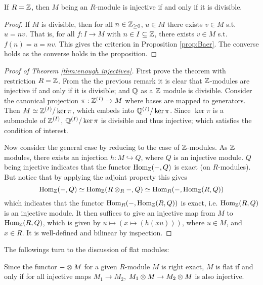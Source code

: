 \documentclass{article}
\begin{document}
\begin{corollary}
    If $R = \mathbb{Z}$, then $M$ being an $R$-module is injective if and only if it is divisible.
\end{corollary}

\begin{proof}
    If $M$ is divisible, then for all $n\in \mathbb{Z}_{\geq 0}$, $u\in M$ there exists $v \in M$ s.t. $u = nv$. That is, for all $f: I \to M$ with $n \in I \subseteq \mathbb{Z}$, there exists $v \in M$ s.t. $f(n) = u = nv$. This gives the criterion in Proposition \ref{prop:Baer}. The converse holds as the converse holds in the proposition.
\end{proof}

\begin{proof}[Proof of Theorem \ref{thm:enough injectives}]
    First prove the theorem with restriction $R = \mathbb{Z}$. From the the previous remark it is clear that $\mathbb{Z}$-modules are injective if and only if it is divisible; and $\mathbb{Q}$ as a $\mathbb{Z}$ module is divisible. Consider the canonical projection $\pi: \mathbb{Z}^{(I)} \to M$ where bases are mapped to generators. Then $M \simeq \mathbb{Z}^{(I)}/\ker \pi$, which embeds into $\mathbb{Q}^{(I)}/\ker \pi$. Since $\ker\pi$ is a submodule of $\mathbb{Z}^{(I)}$, $\mathbb{Q}^{(I)}/\ker \pi$ is divisible and thus injective; which satisfies the condition of interest.

    Now consider the general case by reducing to the case of $\mathbb{Z}$-modules. As $\mathbb{Z}$ modules, there exists an injection $h: M \hookrightarrow Q$, where $Q$ is an injective module. $Q$ being injective indicates that the functor $\mathrm{Hom}_{\mathbb{Z}}(-, Q)$ is exact (on $R$-modules). But notice that by applying the adjoint property this gives
    \[
        \mathrm{Hom}_{\mathbb{Z}}(-, Q) \simeq \mathrm{Hom}_{\mathbb{Z}}(R \otimes_R -, Q) \simeq \mathrm{Hom}_{R}(-, \mathrm{Hom}_{\mathbb{Z}}(R, Q))
    \] 
    which indicates that the functor $\mathrm{Hom}_{R}(-, \mathrm{Hom}_{\mathbb{Z}}(R, Q))$ is exact, i.e. $\mathrm{Hom}_{\mathbb{Z}}(R, Q)$ is an injective module. It then suffices to give an injective map from $M$ to $\mathrm{Hom}_{\mathbb{Z}}(R, Q)$, which is given by $u \mapsto (x \mapsto (h(xu)))$, where $u \in M$, and $x \in R$. It is well-defined and bilinear by inspection.
\end{proof}

The followings turn to the discussion of flat modules:

\begin{remark}
    Since the functor $- \otimes M$ for a given $R$-module $M$ is right exact, $M$ is flat if and only if for all injective maps $M_1 \to M_2$, $M_1 \otimes M \to M_2 \otimes M$ is also injective. 
\end{remark}
\end{document}
